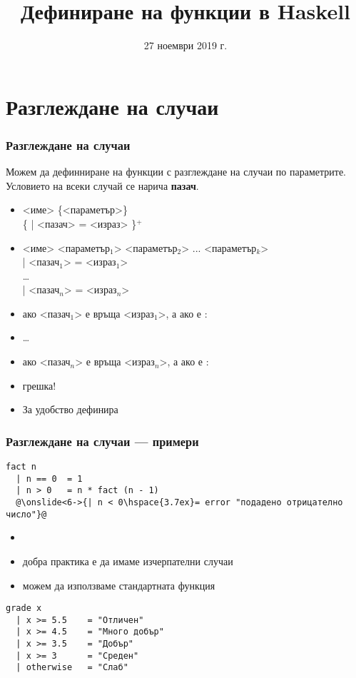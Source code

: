 \documentclass[alsotrans]{beamerswitch}
\title{Дефиниране на функции в Haskell}
\date{27 ноември 2019 г.}
\begin{document}
\begin{frame}
  \titlepage
\end{frame}

\section{Разглеждане на случаи}

\begin{frame}[fragile]
  \frametitle{Разглеждане на случаи}

  Можем да дефинниране на функции с разглеждане на случаи по параметрите.\\
  Условието на всеки случай се нарича \textbf{пазач}.
  \begin{itemize}
    \item{} <име> \{<параметър>\}\\
      \hspace{3ex} \{ \tta| <пазач> \tta= <израз> \}$^+$
      \pause
    \item{} <име> <параметър$_1$> <параметър$_2$> ... <параметър$_k$>\\
      \hspace{3ex} \tta| <пазач$_1$> \tta= <израз$_1$>\\
      \hspace{3ex} \ldots\\
      \hspace{3ex} \tta| <пазач$_n$> \tta= <израз$_n$>\\
      \pause
    \item ако <пазач$_1$> е  връща <израз$_1$>, а ако е :
    \item \ldots
    \item ако <пазач$_n$> е  връща <израз$_n$>, а ако е :
    \item \alert{грешка!}
      \pause
    \item За удобство  дефинира 
  \end{itemize}
\end{frame}

\begin{frame}[fragile]
  \frametitle{Разглеждане на случаи --- примери}

\begin{lstlisting}
fact n
  | n == 0  = 1
  | n > 0   = n * fact (n - 1)
  @\onslide<6->{| n < 0\hspace{3.7ex}= error "подадено отрицателно число"}@
\end{lstlisting}
\onslide<+->
\begin{itemize}[<+->]
\item {}
\item добра практика е да имаме изчерпателни случаи
\item можем да използваме стандартната функция 
\end{itemize}
\onslide<+->
\onslide<+->
\begin{lstlisting}
grade x
  | x >= 5.5    = "Отличен"
  | x >= 4.5    = "Много добър"
  | x >= 3.5    = "Добър"
  | x >= 3      = "Среден"
  | otherwise   = "Слаб"
\end{lstlisting}
\end{frame}
\end{document}
